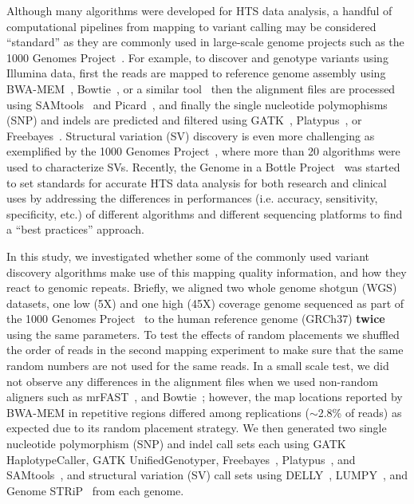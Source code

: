 \documentclass[10pt,a4paper]{article}
\begin{document}
Although many algorithms were developed for HTS data analysis, a handful of computational pipelines from mapping to variant calling may be considered ``standard'' as they are commonly used in large-scale genome projects such as the 1000 Genomes Project~\cite{1000GP,1000GP2012}. For example, to discover and genotype variants using Illumina data, first the reads are mapped to reference genome assembly using BWA-MEM~\cite{Li2009a,Li2013}, Bowtie~\cite{Langmead2009}, or a similar tool~\cite{Alkan2009,Weese2012} then the alignment files are processed using SAMtools~\cite{Li2009b} and Picard~\cite{picard}, and finally the single nucleotide polymophisms (SNP) and indels are predicted and filtered using GATK~\cite{DePristo2011}, Platypus~\cite{Rimmer2014}, or Freebayes~\cite{Garrison2012}. 
Structural variation (SV) discovery is even more challenging as exemplified by the 1000 Genomes Project~\cite{1000GP,1000GP2012,Mills2011}, where more than 20 algorithms were used to characterize SVs.
Recently, the Genome in a Bottle Project~\cite{Zook2014} was started to set standards for accurate HTS data analysis for both research and clinical uses by addressing the differences in performances (i.e. accuracy, sensitivity, specificity, etc.) of different algorithms and different sequencing platforms
 to find a ``best practices'' approach.

In this study, we investigated whether some of the commonly used variant discovery algorithms
make use of this mapping quality information, and how they react to genomic repeats.
Briefly, 
we aligned two whole genome shotgun (WGS) datasets, one low (5X) and one high (45X) coverage genome
sequenced as part of the 1000 Genomes Project~\cite{1000GP2012} to the human reference genome (GRCh37) {\bf twice} using the same parameters. 
To test the effects of random placements 
we shuffled the order of reads in the second mapping experiment to make sure that the same random numbers are not used for the same reads. 
In a small scale test, we did not observe any differences
in the alignment files when we used non-random aligners such as mrFAST~\cite{Alkan2009,Xin2013}, and Bowtie~\cite{Langmead2009}; however, 
the map locations reported by BWA-MEM in repetitive regions differed among replications ($\sim$2.8\% of reads) as expected due to its random placement strategy.
We then generated two single nucleotide polymorphism (SNP) and indel call sets each using GATK~\cite{DePristo2011} HaplotypeCaller, GATK UnifiedGenotyper, Freebayes~\cite{Garrison2012}, Platypus~\cite{Rimmer2014}, and SAMtools~\cite{Li2009b}, and structural variation (SV) call sets using DELLY~\cite{Rausch2012}, LUMPY~\cite{Layer2014}, and Genome STRiP~\cite{Handsaker2011,Handsaker2015} from each genome.
\end{document}
